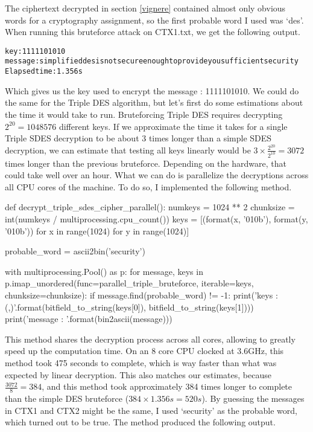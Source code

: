 \documentclass{article}
\begin{document}
The ciphertext decrypted in section \ref{vignere} contained almost only obvious words for a cryptography assignment, so the first probable word I used was `des'. 
When running this bruteforce attack on CTX1.txt, we get the following output.

\begin{alltt}
    key : 1111101010
    message : simplifieddesisnotsecureenoughtoprovideyousufficientsecurity
    Elapsed time : 1.356s
\end{alltt}

Which gives us the key used to encrypt the message : 1111101010. We could do the same for the Triple DES algorithm, but let's first do some estimations about the time it would take to run. Bruteforcing Triple DES requires decrypting $2^{20} = 1 048 576$ different keys. If we approximate the time it takes for a single Triple SDES decryption to be about 3 times longer than a simple SDES decryption, we can estimate that testing all keys linearly would be $3 \times \frac{2^{20}}{2^{10}} = 3072$ times longer than the previous bruteforce. Depending on the hardware, that could take well over an hour. What we can do is parallelize the decryptions across all CPU cores of the machine. To do so, I implemented the following method.\cite{rosetta}

\bigskip
\begin{python}
def decrypt_triple_sdes_cipher_parallel():
    numkeys = 1024 ** 2
    chunksize = int(numkeys / multiprocessing.cpu_count())
    keys = [(format(x, '010b'), format(y, '010b')) for x in range(1024) for y in range(1024)]

    probable_word = ascii2bin('security')

    with multiprocessing.Pool() as p:
        for message, keys in p.imap_unordered(func=parallel_triple_bruteforce, iterable=keys, chunksize=chunksize):
            if message.find(probable_word) != -1:
                print('keys : ({},{})'.format(bitfield_to_string(keys[0]), bitfield_to_string(keys[1])))
                print('message : {}'.format(bin2ascii(message)))
\end{python}
\bigskip

This method shares the decryption process across all cores, allowing to greatly speed up the computation time. On an 8 core CPU clocked at 3.6GHz, this method took 475 seconds to complete, which is way faster than what was expected by linear decryption. This also matches our estimates, because $\frac{3072}{8} = 384$, and this method took approximately 384 times longer to complete than the simple DES bruteforce ($384 \times 1.356s = 520s$).
By guessing the messages in CTX1 and CTX2 might be the same, I used `security' as the probable word, which turned out to be true. The method produced the following output.
\end{document}
